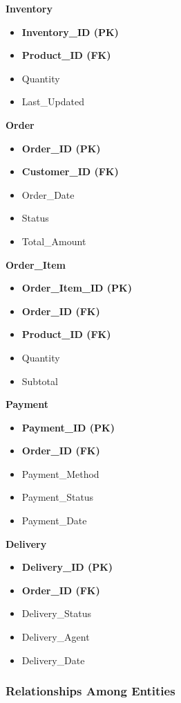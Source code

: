 \documentclass[12pt,a4paper]{article}
\begin{document}
\noindent\textbf{Inventory}
\begin{itemize}
    \item \textbf{Inventory\_ID (PK)}
    \item \textbf{Product\_ID (FK)}
    \item Quantity
    \item Last\_Updated
\end{itemize}

\noindent\textbf{Order}
\begin{itemize}
    \item \textbf{Order\_ID (PK)}
    \item \textbf{Customer\_ID (FK)}
    \item Order\_Date
    \item Status
    \item Total\_Amount
\end{itemize}

\noindent\textbf{Order\_Item}
\begin{itemize}
    \item \textbf{Order\_Item\_ID (PK)}
    \item \textbf{Order\_ID (FK)}
    \item \textbf{Product\_ID (FK)}
    \item Quantity
    \item Subtotal
\end{itemize}

\noindent\textbf{Payment}
\begin{itemize}
    \item \textbf{Payment\_ID (PK)}
    \item \textbf{Order\_ID (FK)}
    \item Payment\_Method
    \item Payment\_Status
    \item Payment\_Date
\end{itemize}

\noindent\textbf{Delivery}
\begin{itemize}
    \item \textbf{Delivery\_ID (PK)}
    \item \textbf{Order\_ID (FK)}
    \item Delivery\_Status
    \item Delivery\_Agent
    \item Delivery\_Date
\end{itemize}

\subsubsection*{Relationships Among Entities}
\end{document}
